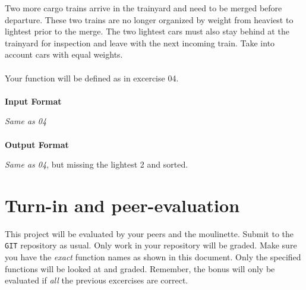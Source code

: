 \documentclass{42-en}
\begin{document}
\exnumber{\exercicenumber}

\makeheaderfiles
    Two more cargo trains arrive in the trainyard and need to be merged before
    departure. These two trains are no longer organized by weight from heaviest
    to lightest prior to the merge. The two lightest cars must also stay behind
    at the trainyard for inspection and leave with the next incoming train.
    Take into account cars with equal weights.\\
    \\
    Your function will be defined as in excercise 04.\\
    \\
    \textbf{Input Format}

    \textit{Same as 04}\\
    \\
    \textbf{Output Format}

    \textit{Same as 04}, but missing the lightest 2 and sorted.

\chapter{Turn-in and peer-evaluation}

    This project will be evaluated by your peers and the moulinette. Submit to
    the \texttt{GIT} repository as usual. Only work in your repository will be
    graded. Make sure you have the \textit{exact} function names as shown in
    this document. Only the specified functions will be looked at and graded.
    Remember, the bonus will only be evaluated if \textit{all} the previous
    excercises are correct.
\end{document}
